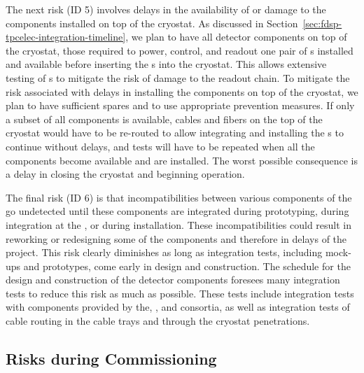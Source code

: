 The next risk (ID 5) involves delays in the availability of or
damage to the  components installed on top of the
cryostat. As discussed in Section~\ref{sec:fdsp-tpcelec-integration-timeline},
we plan to have all  detector components on top of the cryostat, those 
required to power, control, and readout one pair of s installed
and available before inserting the s into the cryostat.
This allows extensive testing of s to mitigate
the risk of damage to the readout chain. To mitigate the risk associated with
delays in installing the  components on top of the cryostat,
we plan to have sufficient spares and to use appropriate  
prevention measures. If only a subset of all components is available, cables 
and fibers on the top of the cryostat would have to be re-routed to allow  
integrating and installing the s to continue without delays, 
and tests will have to be repeated when all the components become available 
and are installed. The worst possible consequence is a delay in closing 
the cryostat and beginning operation. 

The final risk (ID 6) is that incompatibilities 
between various components of the   go undetected until
these components are integrated during prototyping, during integration at 
the , or during installation. These incompatibilities could 
result in reworking or redesigning some of the components and therefore in
delays of the project. This risk clearly
diminishes as long as integration tests, including mock-ups and prototypes,
come early in design and construction. The schedule for the 
design and construction of the  detector components foresees many
integration tests to reduce this risk as much as possible. These tests include integration tests with components provided
by the, , and  consortia, as well as integration
tests of cable routing in the cable trays and through the cryostat
penetrations. 

\subsection{Risks during Commissioning}
\label{sec:fdsp-tpcelec-risks-commissioning}

